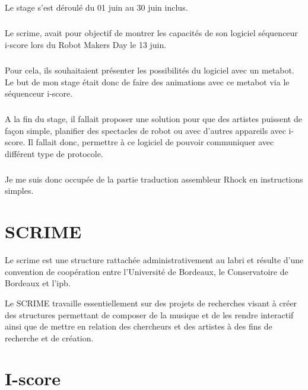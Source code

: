 \documentclass[10pt,a4paper]{report}
\begin{document}
\paragraph{}
Le stage s'est déroulé du 01 juin au 30 juin inclus.
\paragraph{}
Le \acrfull{scrime}, avait pour objectif de montrer les capacités de son logiciel séquenceur i-score lors du Robot Makers Day le 13 juin. 
\paragraph{}
Pour cela, ils souhaitaient présenter les possibilités du logiciel avec un metabot. Le but de mon stage était donc de faire des animations avec ce metabot via le séquenceur i-score. 
\paragraph{}
A la fin du stage, il fallait proposer une solution pour que des artistes puissent de façon simple, planifier des spectacles de robot ou avec d'autres appareils avec i-score. Il fallait donc, permettre à ce logiciel de pouvoir communiquer avec différent type de protocole.
\paragraph{}
Je me suis donc occupée de la partie traduction assembleur Rhock en instructions simples.



\chapter{SCRIME}
Le \acrshort{scrime} est une structure rattachée administrativement au  \acrfull{labri} et résulte d'une convention de coopération entre l'Université de Bordeaux, le Conservatoire de Bordeaux et l'\acrfull{ipb}.

Le SCRIME travaille essentiellement sur des projets de recherches visant à créer des structures permettant de composer de la musique et de les rendre interactif ainsi que  de mettre en relation des chercheurs et des artistes à des fins de recherche et de création.

\chapter{I-score}
\end{document}
